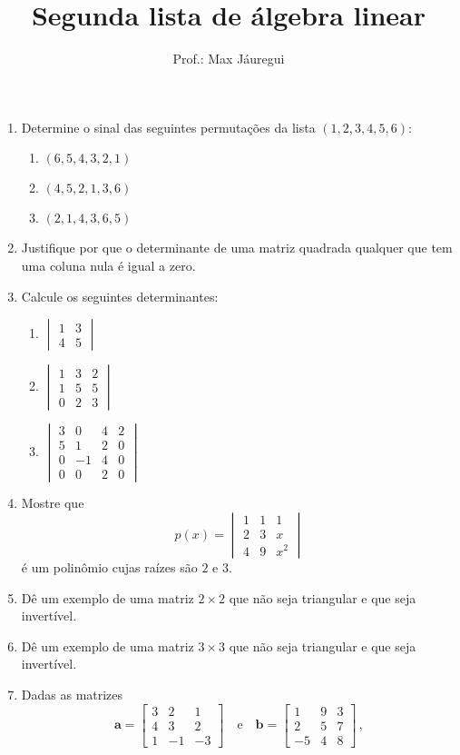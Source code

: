 \documentclass[12pt,a4paper]{article}
\title{Segunda lista de álgebra linear}
\author{Prof.: Max Jáuregui}
\date{}
\newcommand{\mb}{\mathbf}
\begin{document}
\maketitle
\begin{enumerate}
\item Determine o sinal das seguintes permutações da lista $(1,2,3,4,5,6)$:
\begin{enumerate}
\item $(6,5,4,3,2,1)$
\item $(4,5,2,1,3,6)$
\item $(2,1,4,3,6,5)$
\end{enumerate}
\item Justifique por que o determinante de uma matriz quadrada qualquer que tem uma coluna nula é igual a zero.
\item Calcule os seguintes determinantes:
\begin{enumerate}
\item $\begin{vmatrix}1&3\\4&5\end{vmatrix}$
\item $\begin{vmatrix}1&3&2\\1&5&5\\0&2&3\end{vmatrix}$
\item $\begin{vmatrix}3&0&4&2\\5&1&2&0\\0&-1&4&0\\0&0&2&0\end{vmatrix}$
\end{enumerate}
\item Mostre que 
$$p(x)=\begin{vmatrix}1&1&1\\2&3&x\\4&9&x^2\end{vmatrix}$$ é um polinômio cujas raízes são $2$ e $3$.
\item Dê um exemplo de uma matriz $2\times 2$ que não seja triangular e que seja invertível.
\item Dê um exemplo de uma matriz $3\times 3$ que não seja triangular e que seja invertível.
\item Dadas as matrizes
$$\mb a=\begin{bmatrix} 3&2&1\\4&3&2\\1&-1&-3\end{bmatrix}\quad\text{e}\quad\mb b=\begin{bmatrix} 1&9&3\\2&5&7\\-5&4&8\end{bmatrix}\,,$$

\end{enumerate}
\end{document}
